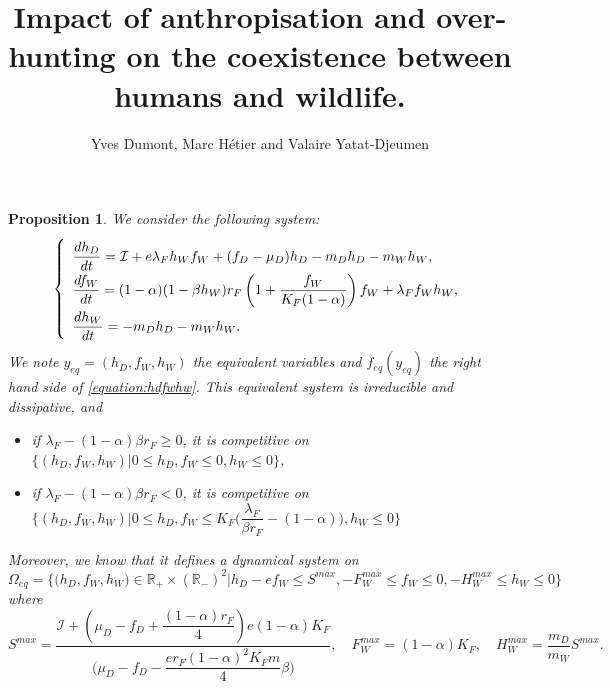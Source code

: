 \documentclass{article}
\title{Impact of anthropisation and over-hunting on the coexistence between humans and wildlife.}
\author{Yves Dumont, Marc Hétier and Valaire Yatat-Djeumen}
\newcommand{\lfw}{\lambda_{F}}
\newcommand{\lfw}{\lambda_{F}}
\newcommand{\cI}{\mathcal{I}}
\newtheorem{prop}[theorem]{Proposition}
\theoremstyle{definition}
\theoremstyle{remark}
\begin{document}
\maketitle

\begin{prop} \label{prop: equivalentSystem}
We consider the following system:
\begin{equation}
\def\arraystretch{2}
\left\{ \begin{array}{l}
\dfrac{dh_D}{dt}= \cI + e\lfw h_W f_W + (f_D - \mu_D) h_D - m_D h_D - m_W h_W, \\
\dfrac{df_W}{dt} = (1-\alpha)(1 - \beta h_W) r_F \left(1 + \dfrac{f_W}{K_F(1-\alpha)} \right) f_W + \lfw f_W h_W, \\
\dfrac{dh_W}{dt}= -m_D h_D - m_W h_W. 
\end{array} \right.
\label{equation:hdfwhw}
\end{equation}
We note $y_{eq} = (h_D, f_W, h_W)$ the equivalent variables and $f_{eq}(y_{eq})$ the right hand side of \eqref{equation:hdfwhw}. This equivalent system is irreducible and dissipative, and
\begin{itemize}
\item if $\lfw - (1-\alpha)\beta r_F \geq 0$, it is competitive on $\Big\{(h_D, f_W, h_W) | 0 \leq h_D, f_W  \leq 0, h_W \leq 0 \Big\}$,
\item if $\lfw - (1-\alpha)\beta r_F < 0$, it is competitive on $\Big\{(h_D, f_W, h_W) | 0 \leq h_D, f_W \leq K_F\big(\dfrac{\lfw}{\beta r_F}-(1-\alpha)\big), h_W \leq 0 \Big\}$ 
\end{itemize}

Moreover, we know that it defines a dynamical system on 
$$
\Omega_{eq} 
 = \Big\{\Big(h_D, f_W, h_W \Big) \in \mathbb{R_+} \times (\mathbb{R_-})^2 \Big|h_D - ef_W \leq S^{max}, -F_W^{max} \leq f_W \leq 0, -H_W^{max} \leq h_W \leq 0 \Big\}
 $$
 where
$$
S^{max} = \dfrac{\cI + \left( \mu_D - f_D   +  \dfrac{(1-\alpha)r_F}{4}\right)e(1-\alpha)K_F}{  \Big(\mu_D -f_D - \dfrac{er_F (1-\alpha)^2K_F m}{4} \beta\Big)} ,
\quad
F_W^{max} = (1-\alpha)K_F,
\quad
H_W^{max} = \dfrac{m_D}{m_W} S^{max}.
$$
\end{prop}
\end{document}
